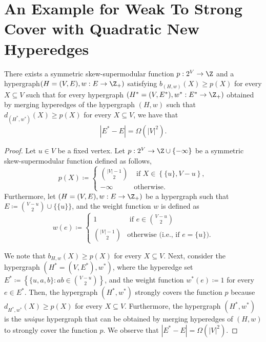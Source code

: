 \section{An Example for Weak To Strong Cover with Quadratic New Hyperedges}\label{sec:appendix:tight-example-weak-to-strong}

\begin{lemma}
There exists a symmetric skew-supermodular function  $p:2^V\rightarrow\Z$ and a hypergraph\linebreak $\left(H = (V, E), w:E \rightarrow\Z_+\right)$ satisfying $b_{(H, w)}(X) \geq p(X)$ for every $X \subseteq V$ such that for every hypergraph $\left(H^* = (V, E^*), w^*:E^* \rightarrow\Z_+\right)$ obtained by merging hyperedges of the hypergraph $(H, w)$ such that $d_{(H^*, w^*)}(X) \geq p(X)$ for every $X\subseteq V$, we have that 
\[
|E^*-E|=\Omega(|V|^2). 
\]
\end{lemma}
\begin{proof}
Let $u\in V$ be a fixed vertex. Let $p:2^V\rightarrow\Z\cup\{-\infty\}$ be a symmetric skew-supermodular function defined as follows,
$$p(X) \coloneqq  \begin{cases}
    {\binom{|V| - 1}{2}}& \text{ if } X \in \left\{\{u\}, V - u\right\},\\
    - \infty &\text{otherwise.}
\end{cases}$$
Furthermore, let $(H = (V, E), w:E\rightarrow\Z_+)$ be a hypergraph such that $E \coloneqq  {\binom{V - u}{2}}\cup \{\{u\}\}$, and the weight function $w$ is defined as
$$w(e) \coloneqq  \begin{cases}
    1& \text{ if } e \in {\binom{V - u}{2}}\\
    {\binom{|V| - 1}{2}}& \text{otherwise (i.e., if $e = \{u\}$)}.
\end{cases}$$

We note that $b_{H, w}(X) \geq p(X)$ for every $X \subseteq V$. Next, consider the hypergraph $(H^* = (V, E^*), w^*)$, where the hyperedge set $E^* \coloneqq  \left\{\{u, a, b\} : ab \in {\binom{V-u}{2}}\right\}$, and the weight function $w^*(e) \coloneqq  1$ for every $e \in E^*$. Then, the hypergraph $(H^*, w^*)$ strongly covers the function $p$ because $d_{H^*, w^*}(X) \geq p(X)$ for every $X \subseteq V$. Furthermore, the hypergraph $(H^*, w^*)$ is the \emph{unique} hypergraph that can be obtained by merging hyperedges of $(H, w)$ to strongly cover the function $p$. We observe that $|E^*-E| = \Omega(|V|^2)$. 
\end{proof}